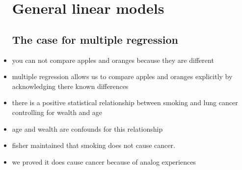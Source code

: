 \documentclass{article}
\begin{document}
\begin{itemize}
\section{General linear models}
\subsection{The case for multiple regression}
\item you can not compare apples and oranges because they are different
\item multiple regression allows us to compare apples and oranges explicitly by acknowledging there known differences
\item there is a positive statistical relationship between smoking and lung cancer controlling for wealth and age
\item age and wealth are confounds for this relationship
\item fisher maintained that smoking does not cause cancer. 
\item we proved it does cause cancer because of analog experiences 

\end{itemize}
\end{document}
